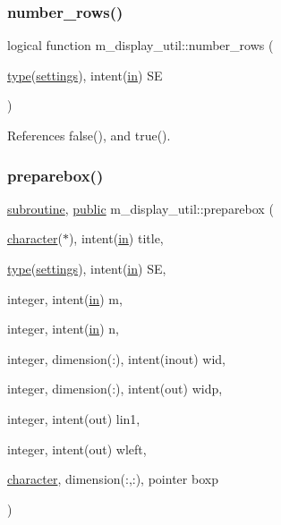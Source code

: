 \subsubsection{\texorpdfstring{number\+\_\+rows()}{number\_rows()}}
{\footnotesize\ttfamily logical function m\+\_\+display\+\_\+util\+::number\+\_\+rows (\begin{DoxyParamCaption}\item[{\hyperlink{stop__watch_83_8txt_a70f0ead91c32e25323c03265aa302c1c}{type}(\hyperlink{structm__display__util_1_1settings}{settings}), intent(\hyperlink{M__journal_83_8txt_afce72651d1eed785a2132bee863b2f38}{in})}]{SE }\end{DoxyParamCaption})\hspace{0.3cm}{\ttfamily [private]}}



References false(), and true().

\mbox{\label{namespacem__display__util_a70f3818ca97ec91537e81b9f9b10953c}} 
\subsubsection{\texorpdfstring{preparebox()}{preparebox()}}
{\footnotesize\ttfamily \hyperlink{M__stopwatch_83_8txt_acfbcff50169d691ff02d4a123ed70482}{subroutine}, \hyperlink{M__stopwatch_83_8txt_a2f74811300c361e53b430611a7d1769f}{public} m\+\_\+display\+\_\+util\+::preparebox (\begin{DoxyParamCaption}\item[{\hyperlink{option__stopwatch_83_8txt_abd4b21fbbd175834027b5224bfe97e66}{character}($\ast$), intent(\hyperlink{M__journal_83_8txt_afce72651d1eed785a2132bee863b2f38}{in})}]{title,  }\item[{\hyperlink{stop__watch_83_8txt_a70f0ead91c32e25323c03265aa302c1c}{type}(\hyperlink{structm__display__util_1_1settings}{settings}), intent(\hyperlink{M__journal_83_8txt_afce72651d1eed785a2132bee863b2f38}{in})}]{SE,  }\item[{integer, intent(\hyperlink{M__journal_83_8txt_afce72651d1eed785a2132bee863b2f38}{in})}]{m,  }\item[{integer, intent(\hyperlink{M__journal_83_8txt_afce72651d1eed785a2132bee863b2f38}{in})}]{n,  }\item[{integer, dimension(\+:), intent(inout)}]{wid,  }\item[{integer, dimension(\+:), intent(out)}]{widp,  }\item[{integer, intent(out)}]{lin1,  }\item[{integer, intent(out)}]{wleft,  }\item[{\hyperlink{option__stopwatch_83_8txt_abd4b21fbbd175834027b5224bfe97e66}{character}, dimension(\+:,\+:), pointer}]{boxp }\end{DoxyParamCaption})}



